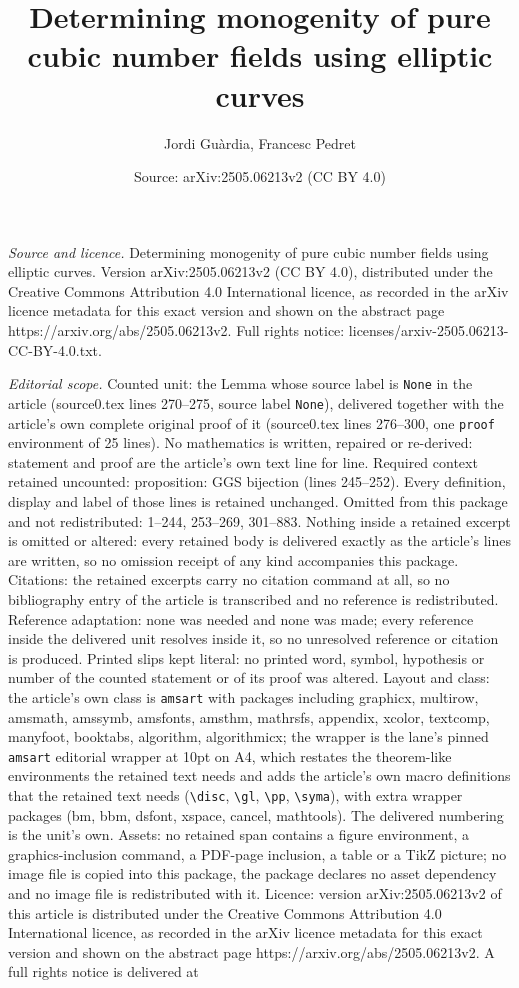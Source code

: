 \documentclass[10pt,a4paper]{amsart}
\title[Determining monogenity of pure cubic number fields using ell]{Determining monogenity of pure cubic number fields using elliptic curves}
\author{Jordi Gu\`ardia, Francesc Pedret}
\date{Source: arXiv:2505.06213v2 (CC BY 4.0)}
\begin{document}
\maketitle

\noindent\emph{Source and licence.} Determining monogenity of pure cubic number fields using elliptic curves. Version arXiv:2505.06213v2 (CC BY 4.0), distributed under the Creative Commons Attribution 4.0 International licence, as recorded in the arXiv licence metadata for this exact version and shown on the abstract page https://arxiv.org/abs/2505.06213v2. Full rights notice: licenses/arxiv-2505.06213-CC-BY-4.0.txt.\par\smallskip

\noindent\textit{Editorial scope.} Counted unit: the Lemma whose source label is \texttt{None} in the article (source0.tex lines 270--275, source label \texttt{None}), delivered together with the article's own complete original proof of it (source0.tex lines 276--300, one \texttt{proof} environment of 25 lines). No mathematics is written, repaired or re-derived: statement and proof are the article's own text line for line. Required context retained uncounted: proposition: GGS bijection (lines 245--252). Every definition, display and label of those lines is retained unchanged. Omitted from this package and not redistributed: 1--244, 253--269, 301--883. Nothing inside a retained excerpt is omitted or altered: every retained body is delivered exactly as the article's lines are written, so no omission receipt of any kind accompanies this package. Citations: the retained excerpts carry no citation command at all, so no bibliography entry of the article is transcribed and no reference is redistributed. Reference adaptation: none was needed and none was made; every reference inside the delivered unit resolves inside it, so no unresolved reference or citation is produced. Printed slips kept literal: no printed word, symbol, hypothesis or number of the counted statement or of its proof was altered. Layout and class: the article's own class is \texttt{amsart} with packages including graphicx, multirow, amsmath, amssymb, amsfonts, amsthm, mathrsfs, appendix, xcolor, textcomp, manyfoot, booktabs, algorithm, algorithmicx; the wrapper is the lane's pinned \texttt{amsart} editorial wrapper at 10pt on A4, which restates the theorem-like environments the retained text needs and adds the article's own macro definitions that the retained text needs (\texttt{\textbackslash disc}, \texttt{\textbackslash gl}, \texttt{\textbackslash pp}, \texttt{\textbackslash syma}), with extra wrapper packages (bm, bbm, dsfont, xspace, cancel, mathtools). The delivered numbering is the unit's own. Assets: no retained span contains a figure environment, a graphics-inclusion command, a PDF-page inclusion, a table or a TikZ picture; no image file is copied into this package, the package declares no asset dependency and no image file is redistributed with it. Licence: version arXiv:2505.06213v2 of this article is distributed under the Creative Commons Attribution 4.0 International licence, as recorded in the arXiv licence metadata for this exact version and shown on the abstract page https://arxiv.org/abs/2505.06213v2. A full rights notice is delivered at 
\end{document}

